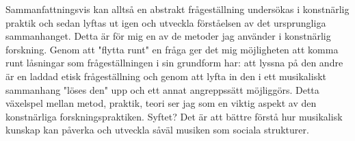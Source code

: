 \documentclass[11pt]{article}
\begin{document}
Sammanfattningsvis kan alltså en abstrakt frågeställning undersökas i konstnärlig praktik och sedan lyftas ut igen och utveckla förståelsen av det ursprungliga sammanhanget. Detta är för mig en av de metoder jag använder i konstnärlig forskning. Genom att "flytta runt" en fråga ger det mig möjligheten att komma runt låsningar som frågeställningen i sin grundform har: att lyssna på den andre är en laddad etisk frågeställning och genom att lyfta in den i ett musikaliskt sammanhang "löses den" upp och ett annat angreppssätt möjliggörs. Detta växelspel mellan metod, praktik, teori ser jag som en viktig aspekt av den konstnärliga forskningspraktiken. Syftet? Det är att bättre förstå hur musikalisk kunskap kan påverka och utveckla såväl musiken som sociala strukturer.
\end{document}
